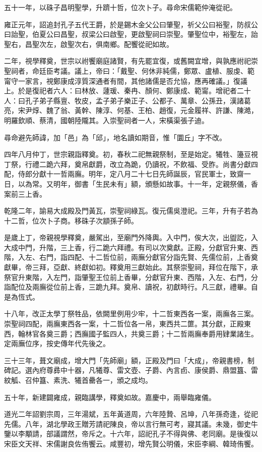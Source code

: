 \begin{pinyinscope}
五十一年，以硃子昌明聖學，升躋十哲，位次卜子。尋命宋儒範仲淹從祀。

雍正元年，詔追封孔子五代王爵，於是錫木金父公曰肇聖，祈父公曰裕聖，防叔公曰詒聖，伯夏公曰昌聖，叔梁公曰啟聖，更啟聖祠曰崇聖。肇聖位中，裕聖左，詒聖右，昌聖次左，啟聖次右，俱南鄉。配饗從祀如故。

二年，視學釋奠，世宗以祔饗廟庭諸賢，有先罷宜復，或舊闕宜增，與孰應祔祀崇聖祠者，命廷臣考議。議上，帝曰：「戴聖、何休非純儒，鄭眾、盧植、服虔、範甯守一家言，視鄭康成淳質深通者有間，其他諸儒是否允協，應再確議。」復議上。於是復祀者六人：曰林放、蘧瑗、秦冉、顏何、鄭康成、範甯。增祀者二十人：曰孔子弟子縣亶、牧皮，孟子弟子樂正子、公都子、萬章、公孫丑，漢諸葛亮，宋尹焞、魏了翁、黃幹、陳淳、何基、王柏、趙復，元金履祥、許謙、陳澔，明羅欽順、蔡清，國朝陸隴其。入崇聖祠者一人，宋橫渠張子迪。

尋命避先師諱，加「邑」為「邱」，地名讀如期音，惟「圜丘」字不改。

四年八月仲丁，世宗親詣釋奠。初，春秋二祀無親祭制，至是始定。犧牲、籩豆視丁祭，行禮二跪六拜，奠帛獻爵，改立為跪，仍讀祝，不飲福、受胙。尚書分獻四配，侍郎分獻十一哲兩廡。明年，定八月二十七日先師誕辰，官民軍士，致齋一日，以為常。又明年，御書「生民未有」額，頒懸如故事。十一年，定親祭儀，香案前三上香。

乾隆二年，諭易大成殿及門黃瓦，崇聖祠綠瓦。復元儒吳澄祀。三年，升有子若為十二哲，位次卜子商。移硃子次顓孫子師。

是歲上丁，帝親視學釋奠，嚴駕出，至廟門外降輿。入中門，俟大次，出盥訖，入大成中門，升階，三上香，行二跪六拜禮。有司以次奠獻。正殿，分獻官升東、西階，入左、右門，詣四配、十二哲位前，兩廡分獻官分詣先賢、先儒位前，上香奠獻畢，帝三拜，亞獻、終獻如初。釋奠用三獻始此。其祭崇聖祠，拜位在階下，承祭官升東階，入左門，詣肇聖王位前上香畢，分獻官升東、西階，入左、右門，分詣配位及兩廡從位前上香，三跪九拜。奠帛、讀祝，初獻時行。凡三獻，禮畢。自是為恆式。

十八年，改正太學丁祭牲品，依闕里例用少牢，十二哲東西各一案，兩廡各三案。崇聖祠四配，兩廡東西各一案，十二哲位各一帛，東西共二篚。其分獻，正殿東西，翰林官各奠三爵；西廡國子監四人，共奠三爵；十二哲兩廡奉爵用肄業諸生。定兩廡位序，按史傳年代先後之。

三十三年，葺文廟成，增大門「先師廟」額，正殿及門曰「大成」，帝親書榜，制碑記。選內府尊彞中十器，凡犧尊、雷文壺、子爵、內言卣、康侯爵、鼎盟簋、雷紋觚、召仲簋、素洗、犧首罍各一，頒之成均。

五十年，新建闢雍成，親臨講學，釋奠如故。嘉慶中，兩舉臨雍儀。

道光二年詔劉宗周，三年湯斌，五年黃道周，六年陸贄、呂坤，八年孫奇逢，從祀先儒。八年，湖北學政王贈芳請祀陳良，帝以言行無可考，寢其議。未幾，御史牛鑒以李顒請，部議謂然，帝斥之。十六年，詔祀孔子不得與佛、老同廟。是後復以宋臣文天祥、宋儒謝良佐侑饗云。咸豐初，增先賢公明儀，宋臣李綱、韓琦侑饗。


\end{pinyinscope}
